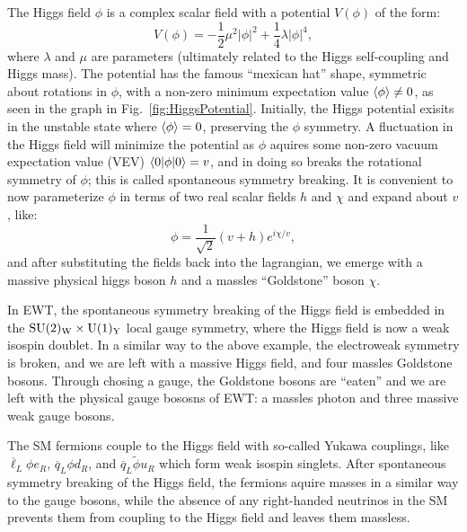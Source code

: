 The Higgs field $\phi$ is a complex scalar field with a potential $V(\phi)$ of the form:
\begin{equation}
    V(\phi) = -\frac{1}{2}\mu^2|\phi|^2 + \frac{1}{4}\lambda|\phi|^4,
\end{equation}
where $\lambda$ and $\mu$ are parameters (ultimately related to the Higgs self-coupling and Higgs mass). The potential has the famous ``mexican hat'' shape, symmetric about rotations in $\phi$, with a non-zero minimum expectation value $\braket{\phi} \neq 0$, as seen in the graph in Fig.~\ref{fig:HiggsPotential}. Initially, the Higgs potential exisits in the unstable state where $\braket{\phi} = 0$, preserving the $\phi$ symmetry. A fluctuation in the Higgs field will minimize the potential as $\phi$ aquires some non-zero vacuum expectation value (VEV) $\braket{0|\phi|0} = v$, and in doing so breaks the rotational symmetry of $\phi$; this is called spontaneous symmetry breaking. It is convenient to now parameterize $\phi$ in terms of two real scalar fields $h$ and $\chi$ and expand about $v$, like:
\begin{equation}
    \phi = \frac{1}{\sqrt{2}}(v+h)e^{i\chi/v},
\end{equation}
and after substituting the fields back into the lagrangian, we emerge with a massive physical higgs boson $h$ and a massles ``Goldstone'' boson $\chi$.

In EWT, the spontaneous symmetry breaking of the Higgs field is embedded in the $\mathrm{SU(2)_{W}}\times\mathrm{U(1)_{Y}}$ local gauge symmetry, where the Higgs field is now a weak isospin doublet. In a similar way to the above example, the electroweak symmetry is broken, and we are left with a massive Higgs field, and four massles Goldstone bosons. Through chosing a gauge, the Goldstone bosons are ``eaten'' and we are left with the physical gauge bososns of EWT: a massles photon and three massive weak gauge bosons. 

The SM fermions couple to the Higgs field with so-called Yukawa couplings, like $\overline{\ell}_L\phi e_R$, $\overline{q}_L\phi d_R$, and $\overline{q}_L\tilde{\phi}u_R$ which form weak isospin singlets. After spontaneous symmetry breaking of the Higgs field, the fermions aquire masses in a similar way to the gauge bosons, while the absence of any right-handed neutrinos in the SM prevents them from coupling to the Higgs field and leaves them massless.

